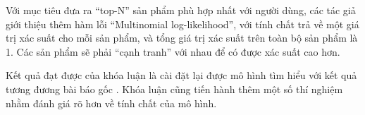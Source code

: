 Với mục tiêu đưa ra ``top-N'' sản phẩm phù hợp nhất với người dùng, các tác giả giới thiệu thêm hàm lỗi ``Multinomial log-likelihood'', với tính chất trả về một giá trị xác suất cho mỗi sản phẩm, và tổng giá trị xác suất trên toàn bộ sản phẩm là 1. Các sản phẩm sẽ phải ``cạnh tranh'' với nhau để có được xác suất cao hơn. 

Kết quả đạt được của khóa luận là cài đặt lại được mô hình tìm hiểu với kết quả tương đương bài báo gốc \cite{mvae}. Khóa luận cũng tiến hành thêm một số thí nghiệm nhằm đánh giá rõ hơn về tính chất của mô hình.


